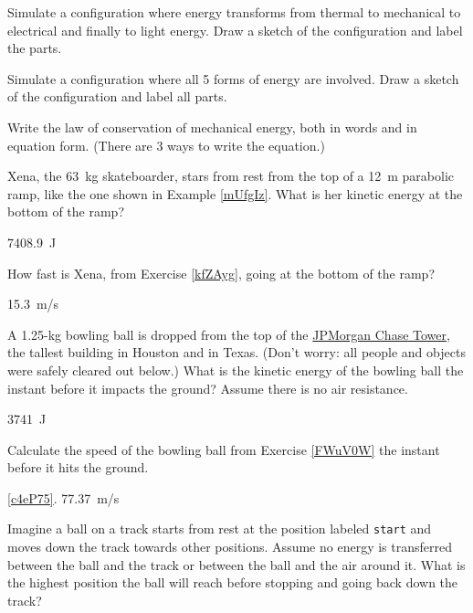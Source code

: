 \documentclass[../main-physics-problems.tex]{subfiles}
\begin{document}
\begin{questions}
\question
Simulate a configuration where energy transforms from thermal to mechanical to electrical and finally to light energy. Draw a sketch of the configuration and label the parts.


\question \label{IPOKOY}
Simulate a configuration where all 5 forms of energy are involved. Draw a sketch of the configuration and label all parts.

\question
Write the law of conservation of mechanical energy, both in words and in equation form. (There are 3 ways to write the equation.)


\question \label{kfZAyg}
Xena, the \SI{63}{kg} skateboarder, stars from rest from the top of a \SI{12}{m} parabolic ramp, like the one shown in Example \ref{mUfgIz}. What is her kinetic energy at the bottom of the ramp?

\begin{solution}
\SI{7408.9}{J}
\end{solution}


\question \label{5Nd1zt}
How fast is Xena, from Exercise \ref{kfZAyg}, going at the bottom of the ramp?

\begin{solution}
\SI{15.3}{m/s}
\end{solution}


\question \label{FWuV0W}
A 1.25-kg bowling ball is dropped from the top of the \href{https://en.wikipedia.org/wiki/JPMorgan_Chase_Tower_(Houston)}{JPMorgan Chase Tower}, the tallest building in Houston and in Texas. (Don't worry: all people and objects were safely cleared out below.) What is the kinetic energy of the bowling ball the instant before it impacts the ground? Assume there is no air resistance.

\begin{solution}
\SI{3741}{J}
\end{solution}

\question \label{c4eP75}
Calculate the speed of the bowling ball from Exercise \ref{FWuV0W} the instant before it hits the ground.

\begin{solution}
\ref{c4eP75}. \SI{77.37}{m/s}
\end{solution}

\question
Imagine a ball on a track starts from rest at the position labeled \texttt{start} and moves down the track towards other positions. Assume no energy is transferred between the ball and the track or between the ball and the air around it. What is the highest position the ball will reach before stopping and going back down the track? 


\end{questions}
\end{document}
